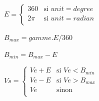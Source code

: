 
$ E = 
\begin{cases}
 360  & \text{si } unit = degree \\
 2 \pi & \text{si } unit = radian\\
\end{cases}
$

$ B_{max} =  gamme . E / 360$

$ B_{min} = B_{max} - E$

$ Vs = 
\begin{cases}
 Ve + E & \text{si } Ve < B_{min} \\
 Ve - E & \text{si } Ve > B_{max} \\
 Ve    & \text{sinon} \\
\end{cases}
$

